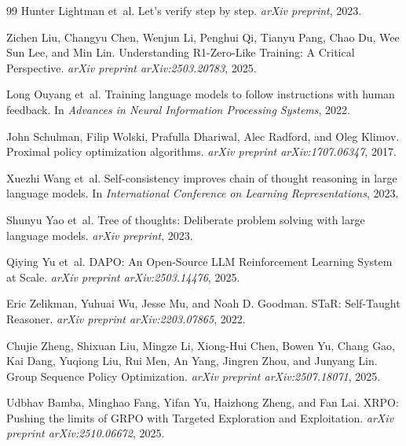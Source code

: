 \documentclass{article}
\begin{document}
\begin{thebibliography}{99}
Hunter Lightman et~al.
\newblock Let's verify step by step.
\newblock \emph{arXiv preprint}, 2023.

Zichen Liu, Changyu Chen, Wenjun Li, Penghui Qi, Tianyu Pang, Chao Du, Wee Sun Lee, and Min Lin.
\newblock Understanding R1-Zero-Like Training: A Critical Perspective.
\newblock \emph{arXiv preprint arXiv:2503.20783}, 2025.

Long Ouyang et~al.
\newblock Training language models to follow instructions with human feedback.
\newblock In \emph{Advances in Neural Information Processing Systems}, 2022.

John Schulman, Filip Wolski, Prafulla Dhariwal, Alec Radford, and Oleg Klimov.
\newblock Proximal policy optimization algorithms.
\newblock \emph{arXiv preprint arXiv:1707.06347}, 2017.

Xuezhi Wang et~al.
\newblock Self-consistency improves chain of thought reasoning in large language models.
\newblock In \emph{International Conference on Learning Representations}, 2023.

Shunyu Yao et~al.
\newblock Tree of thoughts: Deliberate problem solving with large language models.
\newblock \emph{arXiv preprint}, 2023.

Qiying Yu et~al.
\newblock DAPO: An Open-Source LLM Reinforcement Learning System at Scale.
\newblock \emph{arXiv preprint arXiv:2503.14476}, 2025.

Eric Zelikman, Yuhuai Wu, Jesse Mu, and Noah D. Goodman.
\newblock STaR: Self-Taught Reasoner.
\newblock \emph{arXiv preprint arXiv:2203.07865}, 2022.

Chujie Zheng, Shixuan Liu, Mingze Li, Xiong-Hui Chen, Bowen Yu, Chang Gao, Kai Dang, Yuqiong Liu, Rui Men, An Yang, Jingren Zhou, and Junyang Lin.
\newblock Group Sequence Policy Optimization.
\newblock \emph{arXiv preprint arXiv:2507.18071}, 2025.

Udbhav Bamba, Minghao Fang, Yifan Yu, Haizhong Zheng, and Fan Lai.
\newblock XRPO: Pushing the limits of GRPO with Targeted Exploration and Exploitation.
\newblock \emph{arXiv preprint arXiv:2510.06672}, 2025.


\end{thebibliography}
\end{document}
